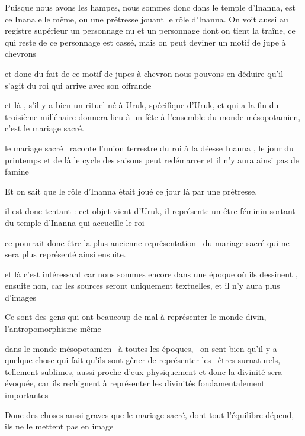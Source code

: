 \documentclass[a4paper]{article}
\begin{document}
{
Puisque nous avons les hampes, nous sommes donc dans le temple d'Inanna, est ce Inana elle même, ou une prêtresse jouant
le rôle d'Inanna. On voit aussi au registre supérieur un personnage nu et un personnage dont on tient la traîne, ce qui
reste de ce personnage est cassé, mais on peut deviner un motif de jupe à chevrons}

{
et donc du fait de ce motif de jupes à chevron nous pouvons en déduire qu'il s'agit du roi qui arrive avec son offrande}


\bigskip

{
et là , s'il y a bien un rituel né à Uruk, spécifique d'Uruk, et qui a la fin du troisième millénaire donnera lieu à un
fête à l'ensemble du monde mésopotamien, c'est le mariage sacré.}


\bigskip

{
le mariage sacré \ raconte l'union terrestre du roi à la déesse Inanna , le jour du printemps et de là le cycle des
saisons peut redémarrer et il n'y aura ainsi pas de famine}

{
Et on sait que le rôle d'Inanna était joué ce jour là par une prêtresse.}

{
il est donc tentant : cet objet vient d'Uruk, il représente un être féminin sortant du temple d'Inanna qui accueille le
roi}

{
ce pourrait donc être la plus ancienne représentation \ du mariage sacré qui ne sera plus représenté ainsi ensuite.}

{
et là c'est intéressant car nous sommes encore dans une époque où ils dessinent , ensuite non, car les sources seront
uniquement textuelles, et il n'y aura plus d'images}

{
Ce sont des gens qui ont beaucoup de mal à représenter le monde divin, l'antropomorphisme même }


\bigskip


\bigskip

{
dans le monde mésopotamien \ à toutes les époques, \ on sent bien qu'il y a quelque chose qui fait qu'ils sont gêner de
représenter les \ êtres surnaturels, tellement sublimes, aussi proche d'eux physiquement et donc la divinité sera
évoquée, car ils rechignent à représenter les divinités fondamentalement importantes}

{
Donc des choses aussi graves que le mariage sacré, dont tout l'équilibre dépend, ils ne le mettent pas en image}
\end{document}
